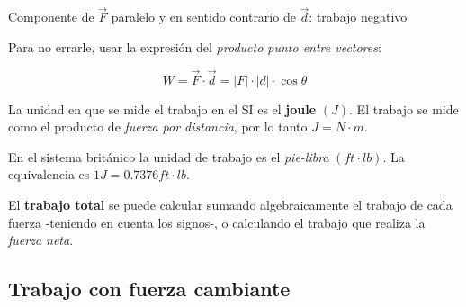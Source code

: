 \vspace{.5cm}
\begin{center}
    Componente de \(\vec{F}\) paralelo y en sentido contrario de \(\vec{d}\):
    trabajo negativo
    \vspace{.25cm}

\end{center}
\vspace{.5cm}

Para no errarle, usar la expresión del \textit{producto punto entre vectores}:

\begin{equation*}
    W = \vec{F} \cdot \vec{d} = |F| \cdot |d| \cdot \cos\theta
\end{equation*}

La unidad en que se mide el trabajo en el SI es el \textbf{joule} \((J)\).
El trabajo se mide como el producto de \textit{fuerza por distancia},
por lo tanto \(J = N \cdot m\).

En el sistema británico la unidad de trabajo es el \textit{pie-libra} \((ft \cdot lb)\).
La equivalencia es \(1 J = 0.7376 ft \cdot lb\).

El \textbf{trabajo total} se puede calcular sumando algebraicamente el trabajo 
de cada fuerza -teniendo en cuenta los signos-, o calculando el trabajo que 
realiza la \textit{fuerza neta}.

\subsection{Trabajo con fuerza cambiante}

